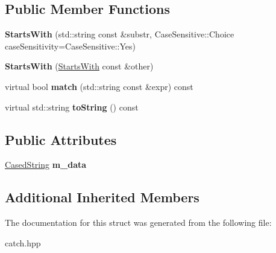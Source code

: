 \subsection*{Public Member Functions}
\begin{DoxyCompactItemize}
\item 
{\bfseries Starts\+With} (std\+::string const \&substr, Case\+Sensitive\+::\+Choice case\+Sensitivity=Case\+Sensitive\+::\+Yes)\hypertarget{structCatch_1_1Matchers_1_1Impl_1_1StdString_1_1StartsWith_a0db1bd8876219464ae60346c9525bcf6}{}\label{structCatch_1_1Matchers_1_1Impl_1_1StdString_1_1StartsWith_a0db1bd8876219464ae60346c9525bcf6}

\item 
{\bfseries Starts\+With} (\hyperlink{structCatch_1_1Matchers_1_1Impl_1_1StdString_1_1StartsWith}{Starts\+With} const \&other)\hypertarget{structCatch_1_1Matchers_1_1Impl_1_1StdString_1_1StartsWith_a5526cb587632e7e46253d6f60ae01098}{}\label{structCatch_1_1Matchers_1_1Impl_1_1StdString_1_1StartsWith_a5526cb587632e7e46253d6f60ae01098}

\item 
virtual bool {\bfseries match} (std\+::string const \&expr) const \hypertarget{structCatch_1_1Matchers_1_1Impl_1_1StdString_1_1StartsWith_ae9c893adbacc853171a488aea5355653}{}\label{structCatch_1_1Matchers_1_1Impl_1_1StdString_1_1StartsWith_ae9c893adbacc853171a488aea5355653}

\item 
virtual std\+::string {\bfseries to\+String} () const \hypertarget{structCatch_1_1Matchers_1_1Impl_1_1StdString_1_1StartsWith_a066fe10e74495cb556abc6895193ba97}{}\label{structCatch_1_1Matchers_1_1Impl_1_1StdString_1_1StartsWith_a066fe10e74495cb556abc6895193ba97}

\end{DoxyCompactItemize}
\subsection*{Public Attributes}
\begin{DoxyCompactItemize}
\item 
\hyperlink{structCatch_1_1Matchers_1_1Impl_1_1StdString_1_1CasedString}{Cased\+String} {\bfseries m\+\_\+data}\hypertarget{structCatch_1_1Matchers_1_1Impl_1_1StdString_1_1StartsWith_accaace83106244c635d251addb028125}{}\label{structCatch_1_1Matchers_1_1Impl_1_1StdString_1_1StartsWith_accaace83106244c635d251addb028125}

\end{DoxyCompactItemize}
\subsection*{Additional Inherited Members}


The documentation for this struct was generated from the following file\+:\begin{DoxyCompactItemize}
\item 
catch.\+hpp\end{DoxyCompactItemize}
